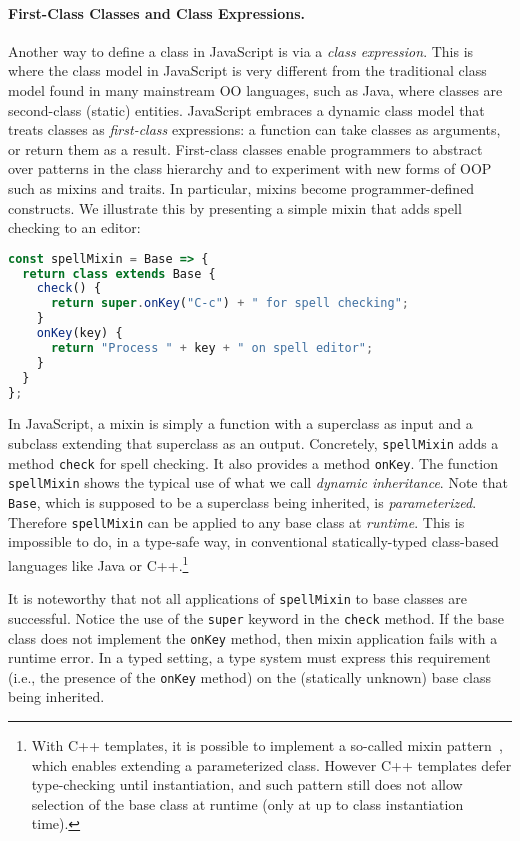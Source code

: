 \paragraph{First-Class Classes and Class Expressions.}

Another way to define a class in JavaScript is via a \emph{class expression}. This is where the class
model in JavaScript is very different from the traditional class model found in
many mainstream OO languages, such as Java, where classes are second-class
(static) entities. JavaScript embraces a dynamic class model that treats classes
as \emph{first-class} expressions: a function can take classes as arguments,
or return them as a result. First-class classes enable programmers to
abstract over patterns in the class hierarchy and to experiment with new forms of OOP
such as mixins and traits. In particular, mixins become programmer-defined
constructs. We illustrate this by presenting a simple mixin that adds
spell checking to an editor:
\begin{lstlisting}[language=JavaScript]
const spellMixin = Base => {
  return class extends Base {
    check() {
      return super.onKey("C-c") + " for spell checking";
    }
    onKey(key) {
      return "Process " + key + " on spell editor";
    }
  }
};
\end{lstlisting}
In JavaScript, a mixin is simply a function with a superclass as input and a
subclass extending that superclass as an output. Concretely, \lstinline{spellMixin}
adds a method \lstinline{check} for spell checking. It also provides
a method \lstinline{onKey}.
The function \lstinline{spellMixin} shows the typical use of what we call \emph{dynamic inheritance}.
Note that \lstinline{Base}, which is supposed to be a superclass being inherited, is \emph{parameterized}.
Therefore \lstinline{spellMixin} can be applied to any base class at
\emph{runtime}. This is impossible to do, in a type-safe way, in
conventional statically-typed class-based languages like Java or
C++.\footnote{With C++ templates, it is possible to
  implement a so-called mixin pattern~\cite{DBLP:conf/gcse/SmaragdakisB00}, which enables extending
a parameterized class. However C++ templates defer type-checking until
instantiation, and such pattern still does not allow selection of the
base class at runtime (only at up to class instantiation time).}

It is noteworthy that not all applications of \lstinline{spellMixin} to base
classes are successful. Notice the use of the \lstinline{super} keyword in the
\lstinline{check} method. If the base class does not implement the
\lstinline{onKey} method, then mixin application fails with a runtime error. In
a typed setting, a type system must express this requirement (i.e., the presence of
the \lstinline{onKey} method) on the (statically unknown) base class being inherited.


